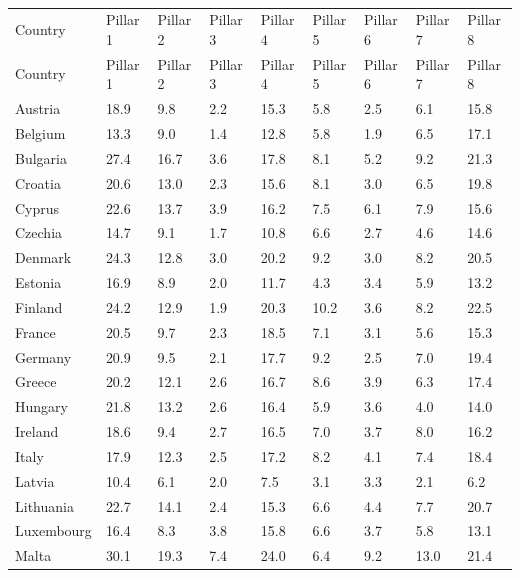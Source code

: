 \documentclass[
]{agujournal2019}
\begin{document}
\begin{longtable}[]{@{}lllllllll@{}}

\caption{\label{tbl-classstage2}Pillar classification results (\%)}

\tabularnewline

\caption{}\label{T_259f0}\tabularnewline
\toprule\noalign{}
Country & Pillar 1 & Pillar 2 & Pillar 3 & Pillar 4 & Pillar 5 & Pillar
6 & Pillar 7 & Pillar 8 \\
\midrule\noalign{}
\endfirsthead
\toprule\noalign{}
Country & Pillar 1 & Pillar 2 & Pillar 3 & Pillar 4 & Pillar 5 & Pillar
6 & Pillar 7 & Pillar 8 \\
\midrule\noalign{}
\endhead
\bottomrule\noalign{}
\endlastfoot
Austria & 18.9 & 9.8 & 2.2 & 15.3 & 5.8 & 2.5 & 6.1 & 15.8 \\
Belgium & 13.3 & 9.0 & 1.4 & 12.8 & 5.8 & 1.9 & 6.5 & 17.1 \\
Bulgaria & 27.4 & 16.7 & 3.6 & 17.8 & 8.1 & 5.2 & 9.2 & 21.3 \\
Croatia & 20.6 & 13.0 & 2.3 & 15.6 & 8.1 & 3.0 & 6.5 & 19.8 \\
Cyprus & 22.6 & 13.7 & 3.9 & 16.2 & 7.5 & 6.1 & 7.9 & 15.6 \\
Czechia & 14.7 & 9.1 & 1.7 & 10.8 & 6.6 & 2.7 & 4.6 & 14.6 \\
Denmark & 24.3 & 12.8 & 3.0 & 20.2 & 9.2 & 3.0 & 8.2 & 20.5 \\
Estonia & 16.9 & 8.9 & 2.0 & 11.7 & 4.3 & 3.4 & 5.9 & 13.2 \\
Finland & 24.2 & 12.9 & 1.9 & 20.3 & 10.2 & 3.6 & 8.2 & 22.5 \\
France & 20.5 & 9.7 & 2.3 & 18.5 & 7.1 & 3.1 & 5.6 & 15.3 \\
Germany & 20.9 & 9.5 & 2.1 & 17.7 & 9.2 & 2.5 & 7.0 & 19.4 \\
Greece & 20.2 & 12.1 & 2.6 & 16.7 & 8.6 & 3.9 & 6.3 & 17.4 \\
Hungary & 21.8 & 13.2 & 2.6 & 16.4 & 5.9 & 3.6 & 4.0 & 14.0 \\
Ireland & 18.6 & 9.4 & 2.7 & 16.5 & 7.0 & 3.7 & 8.0 & 16.2 \\
Italy & 17.9 & 12.3 & 2.5 & 17.2 & 8.2 & 4.1 & 7.4 & 18.4 \\
Latvia & 10.4 & 6.1 & 2.0 & 7.5 & 3.1 & 3.3 & 2.1 & 6.2 \\
Lithuania & 22.7 & 14.1 & 2.4 & 15.3 & 6.6 & 4.4 & 7.7 & 20.7 \\
Luxembourg & 16.4 & 8.3 & 3.8 & 15.8 & 6.6 & 3.7 & 5.8 & 13.1 \\
Malta & 30.1 & 19.3 & 7.4 & 24.0 & 6.4 & 9.2 & 13.0 & 21.4 \\

\end{longtable}
\end{document}

